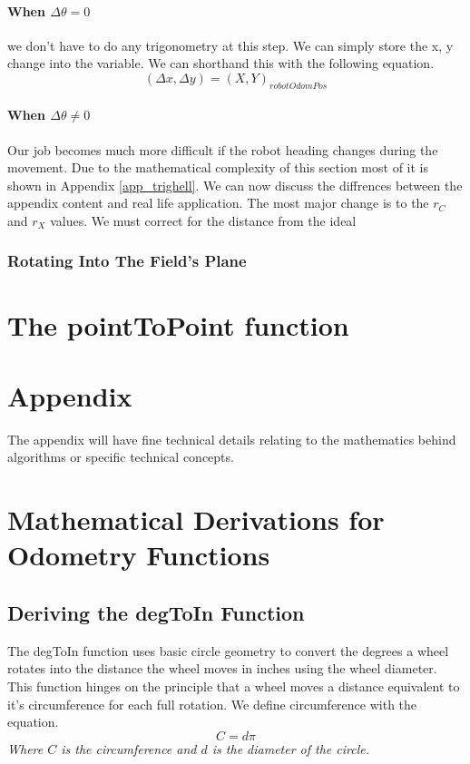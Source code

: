 \documentclass[12pt]{article}
\begin{document}
\paragraph{When $\Delta\theta = 0$}
    we don't have to do any trigonometry at this step. We can simply store the x, y change into the variable. We can shorthand this with the following equation.
    $$ (\Delta x, \Delta y) = (X,Y)_{robotOdomPos} $$
\paragraph{When $\Delta\theta \neq 0$}\label{deltaneqtheta}
Our job becomes much more difficult if the robot heading changes during the movement. Due to the mathematical complexity of this section most of it is shown in Appendix \ref{app_trighell}. We can now discuss the diffrences between the appendix content and real life application. The most major change is to the $r_C$ and $r_X$ values. We must correct for the distance from the ideal
\subsubsection{Rotating Into The Field's Plane}



\section{The pointToPoint function}
%
%
\newpage
\appendix
\section*{Appendix}
The appendix will have fine technical details relating to the mathematics behind algorithms or specific technical concepts.
\section{Mathematical Derivations for Odometry Functions}
\subsection{Deriving the degToIn Function} \label{app_degToIn}
    The degToIn function uses basic circle geometry to convert the degrees a wheel rotates into the distance the wheel moves in inches using the wheel diameter. This function hinges on the principle that a wheel moves a distance equivalent to it's circumference for each full rotation. We define circumference with the equation.
    $$ C = d\pi $$
    \center\textit{Where $C$ is the circumference and $d$ is the diameter of the circle.}
\end{document}
